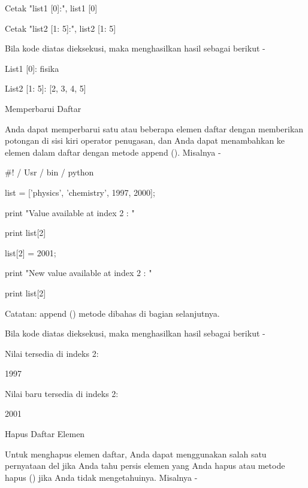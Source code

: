 Cetak "list1 [0]:", list1 [0] \par
Cetak "list2 [1: 5]:", list2 [1: 5] \par
\vspace{12pt}
Bila kode diatas dieksekusi, maka menghasilkan hasil sebagai berikut - \par
\vspace{12pt}
List1 [0]: fisika \par
List2 [1: 5]: [2, 3, 4, 5] \par
\vspace{12pt}
Memperbarui Daftar \par
\vspace{12pt}
Anda dapat memperbarui satu atau beberapa elemen daftar dengan memberikan potongan di sisi kiri operator penugasan, dan Anda dapat menambahkan ke elemen dalam daftar dengan metode append (). Misalnya - \par
\vspace{12pt}
 $  \#  $! / Usr / bin / python \par
\vspace{12pt}
list = ['physics', 'chemistry', 1997, 2000]; \par
\vspace{12pt}
print "Value available at index 2 : " \par
print list[2] \par
list[2] = 2001; \par
print "New value available at index 2 : " \par
print list[2] \par
Catatan: append () metode dibahas di bagian selanjutnya. \par
\vspace{12pt}
Bila kode diatas dieksekusi, maka menghasilkan hasil sebagai berikut - \par
Nilai tersedia di indeks 2: \par
\vspace{12pt}
1997 \par
\vspace{12pt}
Nilai baru tersedia di indeks 2: \par
\vspace{12pt}
2001 \par
\vspace{12pt}
Hapus Daftar Elemen \par
\vspace{12pt}
Untuk menghapus elemen daftar, Anda dapat menggunakan salah satu pernyataan del jika Anda tahu persis elemen yang Anda hapus atau metode hapus () jika Anda tidak mengetahuinya. Misalnya - \par
